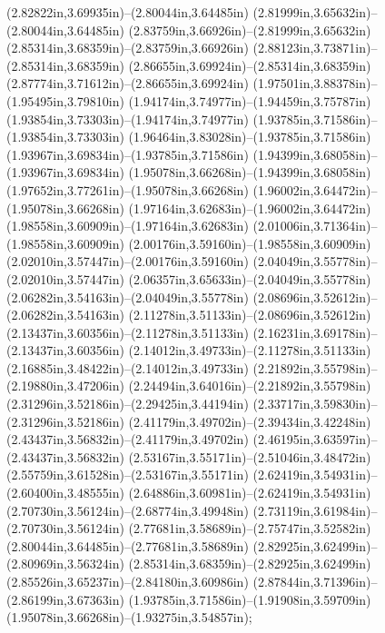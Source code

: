 (2.82822in,3.69935in)--(2.80044in,3.64485in) (2.81999in,3.65632in)--(2.80044in,3.64485in) (2.83759in,3.66926in)--(2.81999in,3.65632in) (2.85314in,3.68359in)--(2.83759in,3.66926in) (2.88123in,3.73871in)--(2.85314in,3.68359in) (2.86655in,3.69924in)--(2.85314in,3.68359in) (2.87774in,3.71612in)--(2.86655in,3.69924in) (1.97501in,3.88378in)--(1.95495in,3.79810in) (1.94174in,3.74977in)--(1.94459in,3.75787in) (1.93854in,3.73303in)--(1.94174in,3.74977in) (1.93785in,3.71586in)--(1.93854in,3.73303in) (1.96464in,3.83028in)--(1.93785in,3.71586in) (1.93967in,3.69834in)--(1.93785in,3.71586in) (1.94399in,3.68058in)--(1.93967in,3.69834in) (1.95078in,3.66268in)--(1.94399in,3.68058in) (1.97652in,3.77261in)--(1.95078in,3.66268in) (1.96002in,3.64472in)--(1.95078in,3.66268in) (1.97164in,3.62683in)--(1.96002in,3.64472in) (1.98558in,3.60909in)--(1.97164in,3.62683in) (2.01006in,3.71364in)--(1.98558in,3.60909in) (2.00176in,3.59160in)--(1.98558in,3.60909in) (2.02010in,3.57447in)--(2.00176in,3.59160in) (2.04049in,3.55778in)--(2.02010in,3.57447in) (2.06357in,3.65633in)--(2.04049in,3.55778in) (2.06282in,3.54163in)--(2.04049in,3.55778in) (2.08696in,3.52612in)--(2.06282in,3.54163in) (2.11278in,3.51133in)--(2.08696in,3.52612in) (2.13437in,3.60356in)--(2.11278in,3.51133in) (2.16231in,3.69178in)--(2.13437in,3.60356in) (2.14012in,3.49733in)--(2.11278in,3.51133in) (2.16885in,3.48422in)--(2.14012in,3.49733in) (2.21892in,3.55798in)--(2.19880in,3.47206in) (2.24494in,3.64016in)--(2.21892in,3.55798in) (2.31296in,3.52186in)--(2.29425in,3.44194in) (2.33717in,3.59830in)--(2.31296in,3.52186in) (2.41179in,3.49702in)--(2.39434in,3.42248in) (2.43437in,3.56832in)--(2.41179in,3.49702in) (2.46195in,3.63597in)--(2.43437in,3.56832in) (2.53167in,3.55171in)--(2.51046in,3.48472in) (2.55759in,3.61528in)--(2.53167in,3.55171in) (2.62419in,3.54931in)--(2.60400in,3.48555in) (2.64886in,3.60981in)--(2.62419in,3.54931in) (2.70730in,3.56124in)--(2.68774in,3.49948in) (2.73119in,3.61984in)--(2.70730in,3.56124in) (2.77681in,3.58689in)--(2.75747in,3.52582in) (2.80044in,3.64485in)--(2.77681in,3.58689in) (2.82925in,3.62499in)--(2.80969in,3.56324in) (2.85314in,3.68359in)--(2.82925in,3.62499in) (2.85526in,3.65237in)--(2.84180in,3.60986in) (2.87844in,3.71396in)--(2.86199in,3.67363in) (1.93785in,3.71586in)--(1.91908in,3.59709in) (1.95078in,3.66268in)--(1.93275in,3.54857in);
